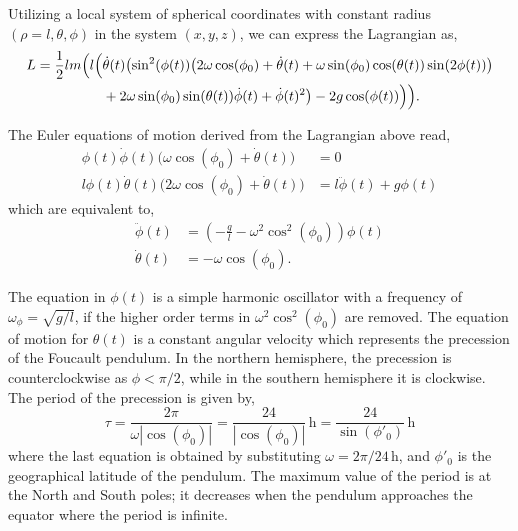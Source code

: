 \documentclass[12pt]{article}
\begin{document}
Utilizing a local system of spherical coordinates with constant radius $(\rho = l, \theta, \phi)$
in the system $(x,y,z)$, we can express the Lagrangian as,
\begin{equation}
  \begin{aligned}
    L = \frac{1}{2}lm\Bigl(l\Bigl(&\dot\theta(t)\bigl(\sin^2(\phi(t))\bigl(2\omega\cos(\phi_0)
        + \dot\theta(t) + \omega\sin(\phi_0)\cos(\theta(t))\sin(2\phi(t))\bigr) \\
      &+2\omega\sin(\phi_0)\sin(\theta(t))\dot\phi(t) + \dot\phi(t)^2\bigr) - 2g\cos(\phi(t))\Bigr)\Bigr).
  \end{aligned}
\end{equation}

The Euler equations of motion derived from the Lagrangian above read,
\begin{align}
  \phi(t)\dot\phi(t)\bigl(\omega\cos(\phi_0) + \dot\theta(t)\bigr) &= 0 \\
  l\phi(t)\dot\theta(t)\bigl(2\omega\cos(\phi_0) + \dot\theta(t)\bigr)
    &= l\ddot\phi(t) + g\phi(t)
\end{align}
which are equivalent to,
\begin{align}
  \ddot\phi(t) &= \left(-\frac{g}{l} - \omega^2\cos^2(\phi_0)\right)\phi(t) \\
  \dot\theta(t) &= -\omega\cos(\phi_0).
\end{align}

The equation in $\phi(t)$ is a simple harmonic oscillator with a frequency of
$\omega_\phi = \sqrt{g/l}$, if the higher order terms in $\omega^2\cos^2(\phi_0)$ are
removed. The equation of motion for $\theta(t)$ is a constant angular velocity which
represents the precession of the Foucault pendulum. In the northern hemisphere, the
precession is counterclockwise as $\phi < \pi/2$, while in the southern hemisphere it is
clockwise. The period of the precession is given by,
\begin{equation}
  \tau = \frac{2\pi}{\omega|\cos(\phi_0)|}
    = \frac{24}{|\cos(\phi_0)|}\,\text{h}
    = \frac{24}{\sin(\phi'_0)}\,\text{h}
\end{equation}
where the last equation is obtained by substituting $\omega = 2\pi/24\,\text{h}$, and
$\phi'_0$ is the geographical latitude of the pendulum. The maximum value of the period is
at the North and South poles; it decreases when the pendulum approaches the equator where the
period is infinite.
\end{document}

